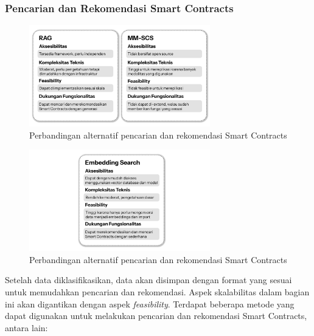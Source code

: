 \subsubsection{Pencarian dan Rekomendasi Smart Contracts}

\begin{figure}[ht]
	\centering
	\includegraphics[width=0.7\textwidth]{resources/chapter-3/pencarian-1.png}
	\caption{Perbandingan alternatif pencarian dan rekomendasi Smart Contracts}
	\label{image:pencarian-1}
\end{figure}

\begin{figure}[ht]
	\centering
	\includegraphics[width=0.7\textwidth]{resources/chapter-3/pencarian-2.png}
	\caption{Perbandingan alternatif pencarian dan rekomendasi Smart Contracts}
	\label{image:pencarian-2}
\end{figure}

Setelah data diklasifikasikan, data akan disimpan dengan format yang sesuai untuk memudahkan pencarian dan rekomendasi. Aspek skalabilitas dalam bagian ini akan digantikan dengan aspek \textit{feasibility}. Terdapat beberapa metode yang dapat digunakan untuk melakukan pencarian dan rekomendasi Smart Contracts, antara lain:

